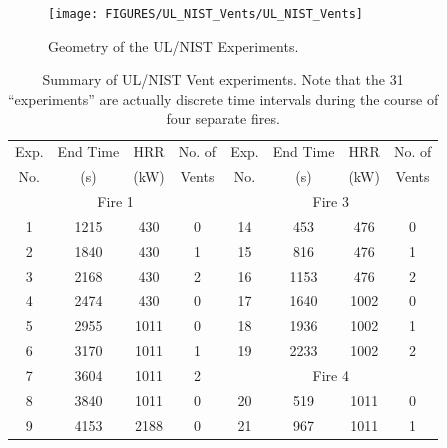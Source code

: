\begin{figure}
\begin{center}
\texttt{[image: FIGURES/UL\_NIST\_Vents/UL\_NIST\_Vents]}
\end{center}
\caption{Geometry of the UL/NIST Experiments.}
\label{UL_NIST_Drawing}
\end{figure}


\begin{table}[h!]
\caption[Summary of UL/NIST Vent experiments]{Summary of UL/NIST Vent experiments. Note that the 31 ``experiments'' are actually discrete time intervals during the course of four separate fires.}
\begin{center}
\begin{tabular}{|c|c|c|c||c|c|c|c|}
\hline
Exp.    & End Time  & HRR           &  No. of   & Exp.    & End Time  & HRR           &  No. of           \\
No.     & (s)       & (kW)          & Vents     & No.     & (s)       & (kW)          & Vents             \\ \hline \hline
\multicolumn{4}{|c||}{Fire 1}                   & \multicolumn{4}{|c|}{Fire 3}                            \\ \hline
1       & 1215      & 430           & 0         & 14      & 453       & 476           & 0                 \\ \hline
2       & 1840      & 430           & 1         & 15      & 816       & 476           & 1                 \\ \hline
3       & 2168      & 430           & 2         & 16      & 1153      & 476           & 2                 \\ \hline
4       & 2474      & 430           & 0         & 17      & 1640      & 1002          & 0                 \\ \hline
5       & 2955      & 1011          & 0         & 18      & 1936      & 1002          & 1                 \\ \hline
6       & 3170      & 1011          & 1         & 19      & 2233      & 1002          & 2                 \\ \hline
7       & 3604      & 1011          & 2         & \multicolumn{4}{|c|}{Fire 4}                            \\ \hline
8       & 3840      & 1011          & 0         & 20      & 519       & 1011          & 0                 \\ \hline
9       & 4153      & 2188          & 0         & 21      & 967       & 1011          & 1                 \\ \hline

\end{tabular}
\end{center}
\end{table}
